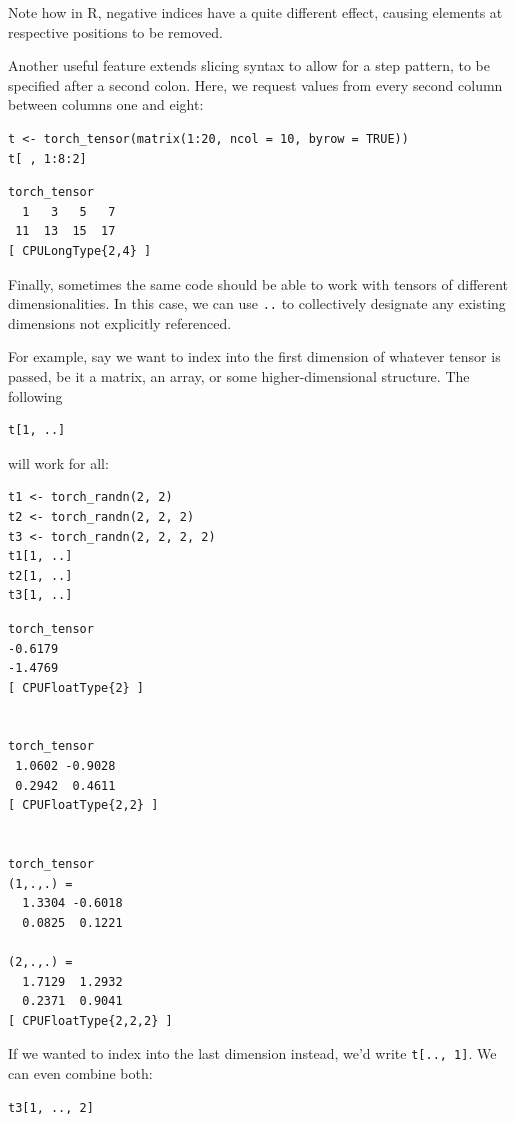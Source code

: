 \documentclass[
  letterpaper,
]{krantz}
\begin{document}
Note how in R, negative indices have a quite different effect, causing
elements at respective positions to be removed.

Another useful feature extends slicing syntax to allow for a step
pattern, to be specified after a second colon. Here, we request values
from every second column between columns one and eight:

\begin{verbatim}
t <- torch_tensor(matrix(1:20, ncol = 10, byrow = TRUE))
t[ , 1:8:2]
\end{verbatim}

\begin{verbatim}
torch_tensor
  1   3   5   7
 11  13  15  17
[ CPULongType{2,4} ]
\end{verbatim}

Finally, sometimes the same code should be able to work with tensors of
different dimensionalities. In this case, we can use \texttt{..} to
collectively designate any existing dimensions not explicitly
referenced.

For example, say we want to index into the first dimension of whatever
tensor is passed, be it a matrix, an array, or some higher-dimensional
structure. The following

\begin{verbatim}
t[1, ..]
\end{verbatim}

will work for all:

\begin{verbatim}
t1 <- torch_randn(2, 2)
t2 <- torch_randn(2, 2, 2)
t3 <- torch_randn(2, 2, 2, 2)
t1[1, ..]
t2[1, ..]
t3[1, ..]
\end{verbatim}

\begin{verbatim}
torch_tensor
-0.6179
-1.4769
[ CPUFloatType{2} ]


torch_tensor
 1.0602 -0.9028
 0.2942  0.4611
[ CPUFloatType{2,2} ]


torch_tensor
(1,.,.) = 
  1.3304 -0.6018
  0.0825  0.1221

(2,.,.) = 
  1.7129  1.2932
  0.2371  0.9041
[ CPUFloatType{2,2,2} ]
\end{verbatim}

If we wanted to index into the last dimension instead, we'd write
\texttt{t{[}..,\ 1{]}}. We can even combine both:

\begin{verbatim}
t3[1, .., 2]
\end{verbatim}
\end{document}
